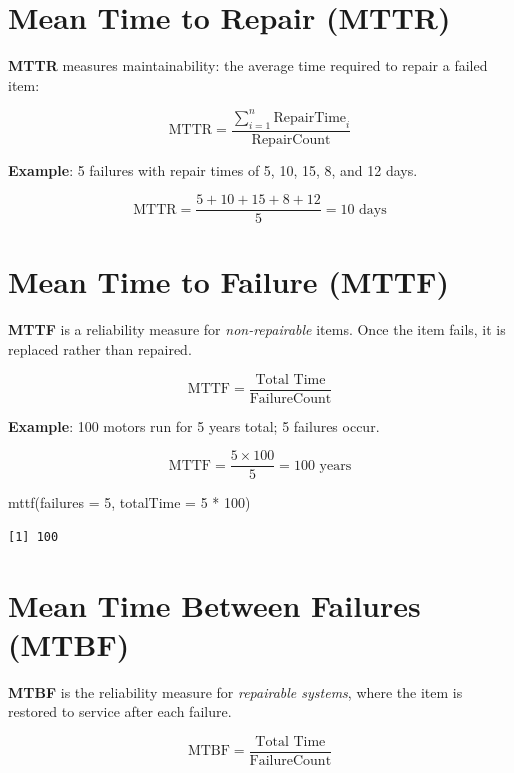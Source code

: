 \documentclass[
  letterpaper,
  DIV=11,
  numbers=noendperiod]{scrreprt}
\newenvironment{Shaded}{\begin{snugshade}}{\end{snugshade}}
\newcommand{\AttributeTok}[1]{\textcolor[rgb]{0.40,0.45,0.13}{#1}}
\newcommand{\DecValTok}[1]{\textcolor[rgb]{0.68,0.00,0.00}{#1}}
\newcommand{\FunctionTok}[1]{\textcolor[rgb]{0.28,0.35,0.67}{#1}}
\newcommand{\NormalTok}[1]{\textcolor[rgb]{0.00,0.23,0.31}{#1}}
\newcommand{\SpecialCharTok}[1]{\textcolor[rgb]{0.37,0.37,0.37}{#1}}
\begin{document}
\section{Mean Time to Repair (MTTR)}\label{mean-time-to-repair-mttr}

\textbf{MTTR} measures maintainability: the average time required to
repair a failed item:

\[\text{MTTR} = \frac{\sum_{i=1}^{n} \text{RepairTime}_i}{\text{RepairCount}}\]

\textbf{Example}: 5 failures with repair times of 5, 10, 15, 8, and 12
days.

\[\text{MTTR} = \frac{5 + 10 + 15 + 8 + 12}{5} = 10 \text{ days}\]

\section{Mean Time to Failure (MTTF)}\label{mean-time-to-failure-mttf}

\textbf{MTTF} is a reliability measure for \emph{non-repairable} items.
Once the item fails, it is replaced rather than repaired.

\[\text{MTTF} = \frac{\text{Total Time}}{\text{FailureCount}}\]

\textbf{Example}: 100 motors run for 5 years total; 5 failures occur.

\[\text{MTTF} = \frac{5 \times 100}{5} = 100 \text{ years}\]

\begin{Shaded}
\begin{Highlighting}[]
\FunctionTok{mttf}\NormalTok{(}\AttributeTok{failures =} \DecValTok{5}\NormalTok{, }\AttributeTok{totalTime =} \DecValTok{5} \SpecialCharTok{*} \DecValTok{100}\NormalTok{)}
\end{Highlighting}
\end{Shaded}

\begin{verbatim}
[1] 100
\end{verbatim}

\section{Mean Time Between Failures
(MTBF)}\label{mean-time-between-failures-mtbf}

\textbf{MTBF} is the reliability measure for \emph{repairable systems},
where the item is restored to service after each failure.

\[\text{MTBF} = \frac{\text{Total Time}}{\text{FailureCount}}\]
\end{document}

